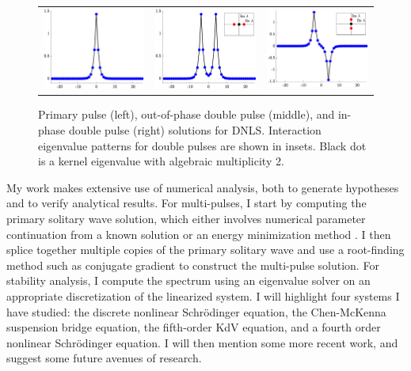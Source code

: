 \documentclass[12pt,reqno,oneside,hidelinks]{article}
\begin{document}
\begin{figure}[H]
    \centering
    \begin{tabular}{ccc}
        \includegraphics[width=5cm]{images/DNLSprimary.eps} &
        \includegraphics[width=5cm]{images/DNLSunstable2p.eps} &
        \includegraphics[width=5cm]{images/DNLSstable2p.eps} 
    \end{tabular}
    \caption{Primary pulse (left), out-of-phase double pulse (middle), and in-phase double pulse (right) solutions for DNLS. Interaction eigenvalue patterns for double pulses are shown in insets. Black dot is a kernel eigenvalue with algebraic multiplicity 2.}
    \label{fig:DNLS2p}
\end{figure}

My work makes extensive use of numerical analysis, both to generate hypotheses and to verify analytical results. For multi-pulses, I start by computing the primary solitary wave solution, which either involves numerical parameter continuation from a known solution or an energy minimization method \cite{Chamard2011}. I then splice together multiple copies of the primary solitary wave and use a root-finding method such as conjugate gradient to construct the multi-pulse solution. For stability analysis, I compute the spectrum using an eigenvalue solver on an appropriate discretization of the linearized system. I will highlight four systems I have studied: the discrete nonlinear Schr\"odinger equation, the Chen-McKenna suspension bridge equation, the fifth-order KdV equation, and a fourth order nonlinear Schr\"odinger equation. I will then mention some more recent work, and suggest some future avenues of research.
\end{document}
